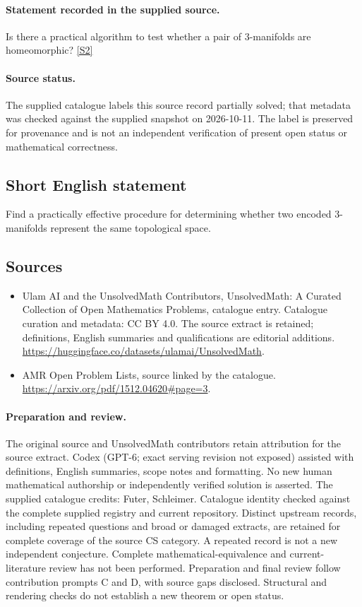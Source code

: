 \documentclass[11pt]{article}
\begin{document}
\paragraph{Statement recorded in the supplied source.}
Is there a practical algorithm to test whether a pair of $3$-manifolds are homeomorphic? \href{https://arxiv.org/pdf/1512.04620#page=3}{[S2]}
\paragraph{Source status.}
The supplied catalogue labels this source record partially solved; that metadata was checked against the supplied snapshot on 2026-10-11. The label is preserved for provenance and is not an independent verification of present open status or mathematical correctness.
\subsection{Short English statement}
Find a practically effective procedure for determining whether two encoded 3-manifolds represent the same topological space.
\subsection{Sources}
\begin{itemize}
\item[S1] Ulam AI and the UnsolvedMath Contributors, UnsolvedMath: A Curated Collection of Open Mathematics Problems, catalogue entry. Catalogue curation and metadata: CC BY 4.0. The source extract is retained; definitions, English summaries and qualifications are editorial additions.
\url{https://huggingface.co/datasets/ulamai/UnsolvedMath}.
\item[S2] AMR Open Problem Lists, source linked by the catalogue.
\url{https://arxiv.org/pdf/1512.04620#page=3}.
\end{itemize}
\paragraph{Preparation and review.}
The original source and UnsolvedMath contributors retain attribution for the source extract. Codex (GPT-6; exact serving revision not exposed) assisted with definitions, English summaries, scope notes and formatting. No new human mathematical authorship or independently verified solution is asserted. The supplied catalogue credits: Futer, Schleimer. Catalogue identity checked against the complete supplied registry and current repository. Distinct upstream records, including repeated questions and broad or damaged extracts, are retained for complete coverage of the source CS category. A repeated record is not a new independent conjecture. Complete mathematical-equivalence and current-literature review has not been performed. Preparation and final review follow contribution prompts C and D, with source gaps disclosed. Structural and rendering checks do not establish a new theorem or open status.
\label{end:statement}
\end{document}
